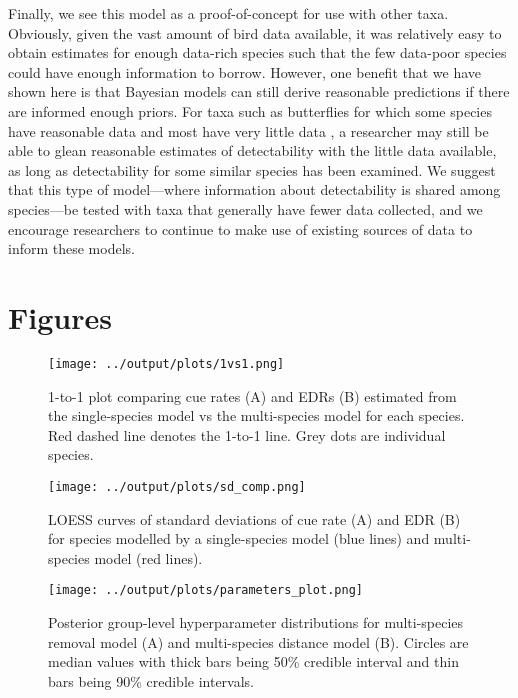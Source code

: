 \documentclass[12pt]{article}
\begin{document}
\par Finally, we see this model as a proof-of-concept for use with other taxa.
Obviously, given the vast amount of bird data available, it was relatively easy to obtain estimates for enough data-rich species such that the few data-poor species could have enough information to borrow. 
However, one benefit that we have shown here is that Bayesian models can still derive reasonable predictions if there are informed enough priors.
For taxa such as butterflies for which some species have reasonable data and most have very little data \citep{lewthwaite_geographical_2022}, a researcher may still be able to glean reasonable estimates of detectability with the little data available, as long as detectability for some similar species has been examined.
We suggest that this type of model---where information about detectability is shared among species---be tested with taxa that generally have fewer data collected, and we encourage researchers to continue to make use of existing sources of data \citep{binley_minimizing_2023} to inform these models.



\section{Figures}

\begin{figure}[h]
	\texttt{[image: ../output/plots/1vs1.png]}
	\caption{1-to-1 plot comparing cue rates (A) and EDRs (B) estimated from the single-species model vs the multi-species model for each species. Red dashed line denotes the 1-to-1 line. Grey dots are individual species.}
	\label{fig:1vs1}
\end{figure}

\begin{figure}[h]
	\texttt{[image: ../output/plots/sd\_comp.png]}
	\caption{LOESS curves of standard deviations of cue rate (A) and EDR (B) for species modelled by a single-species model (blue lines) and multi-species model (red lines).}
	\label{fig:sd}
\end{figure}

\begin{figure}[h]
	\texttt{[image: ../output/plots/parameters\_plot.png]}
	\caption{Posterior group-level hyperparameter distributions for multi-species removal model (A) and multi-species distance model (B). Circles are median values with thick bars being 50\% credible interval and thin bars being 90\% credible intervals.}
	\label{fig:params}
\end{figure}
\end{document}

